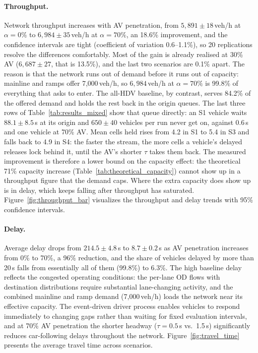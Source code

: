\documentclass[review,number]{elsarticle}
\begin{document}
\paragraph{Throughput.} Network throughput increases with AV penetration, from $5{,}891 \pm 18$\,veh/h at $\alpha = 0\%$ to $6{,}984 \pm 35$\,veh/h at $\alpha = 70\%$, an 18.6\% improvement, and the confidence intervals are tight (coefficient of variation 0.6--1.1\%), so 20 replications resolve the differences comfortably. Most of the gain is already realised at 30\% AV ($6{,}687 \pm 27$, that is 13.5\%), and the last two scenarios are 0.1\% apart. The reason is that the network runs out of demand before it runs out of capacity: mainline and ramps offer 7{,}000\,veh/h, so $6{,}984$\,veh/h at $\alpha = 70\%$ is 99.8\% of everything that asks to enter. The all-HDV baseline, by contrast, serves 84.2\% of the offered demand and holds the rest back in the origin queues. The last three rows of Table~\ref{tab:results_mixed} show that queue directly: an S1 vehicle waits $88.1 \pm 8.5$\,s at its origin and $650 \pm 40$ vehicles per run never get on, against $0.6$\,s and one vehicle at 70\% AV. Mean cells held rises from 4.2 in S1 to 5.4 in S3 and falls back to 4.9 in S4: the faster the stream, the more cells a vehicle's delayed releases lock behind it, until the AV's shorter $\tau$ takes them back. The measured improvement is therefore a lower bound on the capacity effect: the theoretical 71\% capacity increase (Table~\ref{tab:theoretical_capacity}) cannot show up in a throughput figure that the demand caps. Where the extra capacity does show up is in delay, which keeps falling after throughput has saturated. Figure~\ref{fig:throughput_bar} visualizes the throughput and delay trends with 95\% confidence intervals.

\paragraph{Delay.} Average delay drops from $214.5 \pm 4.8$\,s to $8.7 \pm 0.2$\,s as AV penetration increases from 0\% to 70\%, a 96\% reduction, and the share of vehicles delayed by more than 20\,s falls from essentially all of them (99.8\%) to 6.3\%. The high baseline delay reflects the congested operating conditions: the per-lane OD flows with destination distributions require substantial lane-changing activity, and the combined mainline and ramp demand (7{,}000\,veh/h) loads the network near its effective capacity. The event-driven driver process enables vehicles to respond immediately to changing gaps rather than waiting for fixed evaluation intervals, and at 70\% AV penetration the shorter headway ($\tau = 0.5$\,s vs.\ 1.5\,s) significantly reduces car-following delays throughout the network. Figure~\ref{fig:travel_time} presents the average travel time across scenarios.
\end{document}
